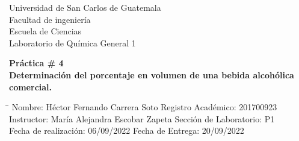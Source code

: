 \documentclass[12pt,letterpaper]{article}
\begin{document}


\renewcommand{\refname}{Bibliografía}
\renewcommand{\tablename}{Tabla}
\renewcommand{\thefigure}{\roman{figure}}
\renewcommand{\thetable}{\roman{table}}



\begin{titlepage}

\begin{flushleft}
Universidad de San Carlos de Guatemala\\
Facultad de ingeniería\\
Escuela de Ciencias\\
Laboratorio de Química General 1\\
\end{flushleft}

\vspace{7 cm}

\begin{center}
\textbf{Práctica \# 4}\\
{\large \textbf{Determinación del porcentaje en volumen de una bebida alcohólica comercial.}}
\end{center}

\vspace{8 cm}

\begin{tabbing}
\hspace{3cm}\=\hspace{9cm}\=\kill
 Nombre: Héctor Fernando Carrera Soto\>   \> Registro Académico: 201700923\\ 
 Instructor: María Alejandra Escobar Zapeta\>   \> Sección de Laboratorio: P1\\ 
 Fecha de realización: 06/09/2022\>   \> Fecha de Entrega: 20/09/2022
\end{tabbing} 

\end{titlepage}


\end{document}
